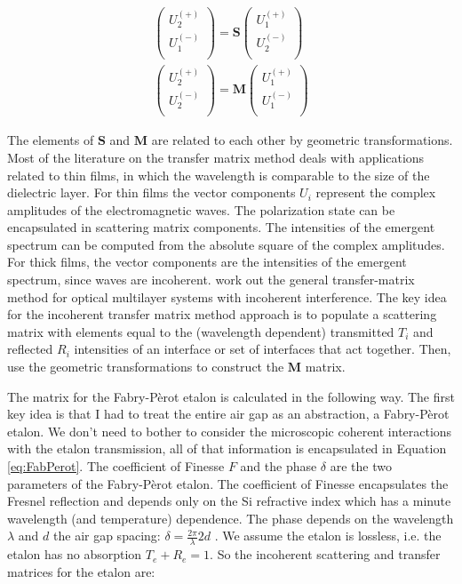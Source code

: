 \begin{eqnarray}
\left(
\begin{array}{c}
 U_2^{(+)} \\
 U_1^{(-)} \\
\end{array}
\right)=\boldsymbol{S} \left(
\begin{array}{c}
 U_1^{(+)} \\
 U_2^{(-)} \\
\end{array}
\right) \\
\left(
\begin{array}{c}
 U_2^{(+)} \\
 U_2^{(-)} \\
\end{array}
\right)=\boldsymbol{M} \left(
\begin{array}{c}
 U_1^{(+)} \\
 U_1^{(-)} \\
\end{array}
\right)
\end{eqnarray}

The elements of $\boldsymbol{S}$ and $\boldsymbol{M}$ are related to each other by geometric transformations\cite{2007SalehTeich}.  Most of the literature on the transfer matrix method deals with applications related to thin films, in which the wavelength is comparable to the size of the dielectric layer.  For thin films the vector components $U_{i}$ represent the complex amplitudes of the electromagnetic waves.  The polarization state can be encapsulated in scattering matrix components\cite{2007SalehTeich}.  The intensities of the emergent spectrum can be computed from the absolute square of the complex amplitudes.  For thick films, the vector components are the intensities of the emergent spectrum, since waves are incoherent.  \cite{2002ApOpt..41.3978K} work out the general transfer-matrix method for optical multilayer systems with incoherent interference.  The key idea for the incoherent transfer matrix method approach is to populate a scattering matrix with elements equal to the (wavelength dependent) transmitted $T_i$ and reflected $R_i$ intensities of an interface or set of interfaces that act together.  Then, use the geometric transformations to construct the $\boldsymbol{M}$ matrix.  

The matrix for the Fabry-P\`erot etalon is calculated in the following way.  The first key idea is that I had to treat the entire air gap as an abstraction, a Fabry-P\`erot etalon.  We don't need to bother to consider the microscopic coherent interactions with the etalon transmission, all of that information is encapsulated in Equation \ref{eq:FabPerot}.  The coefficient of Finesse $F$ and the phase $\delta$ are the two parameters of the Fabry-P\`erot etalon.  The coefficient of Finesse encapsulates the Fresnel reflection and depends only on the Si refractive index which has a minute wavelength (and temperature) dependence.  The phase depends on the wavelength $\lambda$ and $d$ the air gap spacing: $\delta=\frac{2\pi}{\lambda}2d$ .  We assume the etalon is lossless, i.e. the etalon has no absorption $T_e+R_e=1$.  So the incoherent scattering and transfer matrices for the etalon are:

